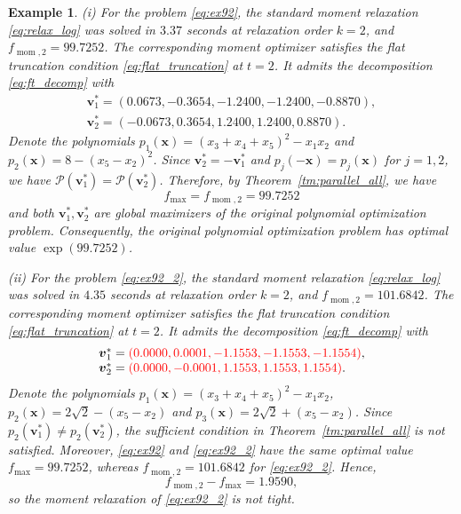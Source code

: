 \documentclass[pdflatex,sn-mathphys-num]{sn-jnl}%
\newcommand{\rd}[1]{{\color{red}#1}}
\newcommand{\vect}[1]{\boldsymbol{#1}}
\theoremstyle{thmstyleone}%
\theoremstyle{thmstyletwo}%
\newtheorem{example}{Example}%
\theoremstyle{thmstylethree}%
\begin{document}
\begin{example}
	
	(i) For the problem \eqref{eq:ex92}, \rd{the standard moment relaxation
	\eqref{eq:relax_log} was solved in $3.37$ seconds} at relaxation order
	$k=2$, and $f_{\operatorname{mom},2}=99.7252$.
	The corresponding moment optimizer satisfies the flat truncation 
	condition \eqref{eq:flat_truncation} at $t=2$.
	It admits the decomposition \eqref{eq:ft_decomp} with 
	\[\begin{array}{ll}
		\vect{v}_1^* = ( 0.0673,
		-0.3654,
		-1.2400,
		-1.2400,
		-0.8870),\\
		\vect{v}_2^* =  (-0.0673,
		0.3654,
		1.2400,
		1.2400,
		0.8870).
	\end{array}
	\]
	Denote the polynomials $p_1(\vect{x}) = (x_3+x_4+x_5)^2-x_1x_2$
	and $p_2(\vect{x}) = 8-(x_5-x_2)^2$.
	\rd{Since $\vect{v}_2^*=-\vect{v}_1^*$ and
	$p_j(-\vect{x})=p_j(\vect{x})$ for $j=1,2$, we have
	$\mathcal{P}(\vect{v}_1^*)=\mathcal{P}(\vect{v}_2^*)$.}
	Therefore, by Theorem~\ref{tm:parallel_all}, we have
	\[
	f_{\max} = f_{\operatorname{mom},2} = 99.7252
	\]
	and both $\vect{v}_1^*,\vect{v}_2^*$ are global maximizers of the
	original polynomial optimization problem.
	\rd{Consequently, the original polynomial optimization problem has
	optimal value $\exp(99.7252)$.}
	
	
	(ii) For the problem \eqref{eq:ex92_2},
	\rd{the standard moment relaxation \eqref{eq:relax_log} was solved in
	$4.35$ seconds} at relaxation order $k=2$, and
	$f_{\operatorname{mom},2}=101.6842$.
	The corresponding moment optimizer satisfies the flat truncation 
	condition \eqref{eq:flat_truncation} at $t=2$.
	It admits the decomposition \eqref{eq:ft_decomp} with 
	\[\begin{array}{ll}
		\vect{v}_1^* = \rd{(0.0000,
		0.0001,
		-1.1553,
		-1.1553,
		-1.1554)},\\
		\vect{v}_2^* = \rd{(0.0000,
		-0.0001,
		1.1553,
		1.1553,
		1.1554)}.
	\end{array}
	\]
	Denote the polynomials $p_1(\vect{x}) = (x_3+x_4+x_5)^2-x_1x_2$, 
	$p_2(\vect{x}) = 2\sqrt{2}-(x_5-x_2)$ and $p_3(\vect{x}) = 2\sqrt{2}+(x_5-x_2)$.
	\rd{Since $p_2(\vect{v}_1^*)\neq p_2(\vect{v}_2^*)$, the sufficient
	condition in Theorem~\ref{tm:parallel_all} is not satisfied.
	Moreover, \eqref{eq:ex92} and \eqref{eq:ex92_2} have the same
	optimal value $f_{\max}=99.7252$, whereas
	$f_{\operatorname{mom},2}=101.6842$ for \eqref{eq:ex92_2}. Hence,
	\[
	f_{\operatorname{mom},2}-f_{\max}=1.9590,
	\]
	so the moment relaxation of \eqref{eq:ex92_2} is not tight.}
\end{example}
\end{document}
